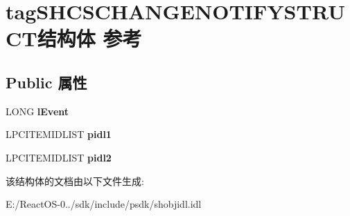 \hypertarget{structtag_s_h_c_s_c_h_a_n_g_e_n_o_t_i_f_y_s_t_r_u_c_t}{}\section{tag\+S\+H\+C\+S\+C\+H\+A\+N\+G\+E\+N\+O\+T\+I\+F\+Y\+S\+T\+R\+U\+C\+T结构体 参考}
\label{structtag_s_h_c_s_c_h_a_n_g_e_n_o_t_i_f_y_s_t_r_u_c_t}
\subsection*{Public 属性}
\begin{DoxyCompactItemize}
\item 
\mbox{\label{structtag_s_h_c_s_c_h_a_n_g_e_n_o_t_i_f_y_s_t_r_u_c_t_a8a9ef5e18529ebecccbdc58a33ab8b42}} 
L\+O\+NG {\bfseries l\+Event}
\item 
\mbox{\label{structtag_s_h_c_s_c_h_a_n_g_e_n_o_t_i_f_y_s_t_r_u_c_t_aa1dd54c9b01a5466d25ea11ac4d63598}} 
L\+P\+C\+I\+T\+E\+M\+I\+D\+L\+I\+ST {\bfseries pidl1}
\item 
\mbox{\label{structtag_s_h_c_s_c_h_a_n_g_e_n_o_t_i_f_y_s_t_r_u_c_t_a30b8788ae3a946ea0451b5a3b0335065}} 
L\+P\+C\+I\+T\+E\+M\+I\+D\+L\+I\+ST {\bfseries pidl2}
\end{DoxyCompactItemize}


该结构体的文档由以下文件生成\+:\begin{DoxyCompactItemize}
\item 
E\+:/\+React\+O\+S-\/0../sdk/include/psdk/shobjidl.\+idl\end{DoxyCompactItemize}
